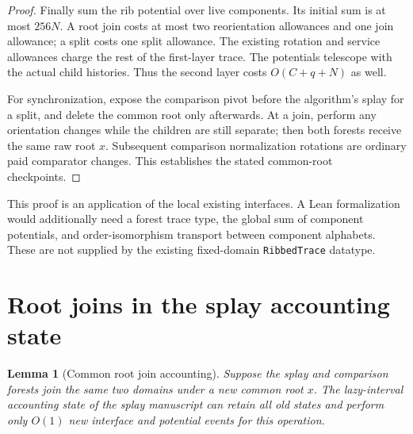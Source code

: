 \documentclass[11pt]{article}
\newtheorem{lemma}[theorem]{Lemma}
\begin{document}
\begin{proof}
Finally sum the rib potential over live components. Its initial sum is
at most $256N$. A root join costs at most two reorientation allowances
and one join allowance; a split costs one split allowance. The existing
rotation and service allowances charge the rest of the first-layer
trace. The potentials telescope with the actual child histories.
Thus the second layer costs $O(C+q+N)$ as well.

For synchronization, expose the comparison pivot before the algorithm's
splay for a split, and delete the common root only afterwards. At a
join, perform any orientation changes while the children are still
separate; then both forests receive the same raw root $x$. Subsequent
comparison normalization rotations are ordinary paid comparator changes.
This establishes the stated common-root checkpoints.
\end{proof}

This proof is an application of the local existing interfaces. A Lean
formalization would additionally need a forest trace type, the global
sum of component potentials, and order-isomorphism transport between
component alphabets. These are not supplied by the existing fixed-domain
\texttt{RibbedTrace} datatype.

\section{Root joins in the splay accounting state}

\begin{lemma}[Common root join accounting]\label{lem:heap-join}
Suppose the splay and comparison forests join the same two domains
under a new common root $x$. The lazy-interval accounting state of the
splay manuscript can retain all old states and perform only $O(1)$ new
interface and potential events for this operation.
\end{lemma}
\end{document}
